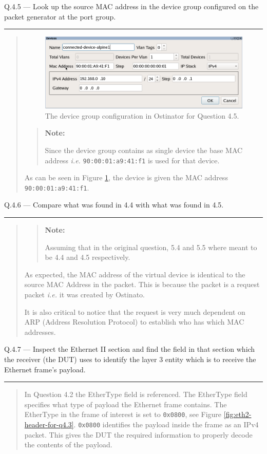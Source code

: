 \documentclass{article}
\newcommand\Que[2]{%
   \begin{samepage}
   \leavevmode\par
   \noindent
   Q.#1 --- #2\par\vspace{10pt}\hrule\vspace{10pt}
   \end{samepage}}
\newenvironment{ans}
   {\fbox{Answer}\begin{quote}\nopagebreak}
   {\end{quote}}
\newcommand\ie{\emph{i.e.}}
\newenvironment{note}{%
    \begin{quote}
    \begin{tcolorbox}[colback=gray!10,arc=0mm,boxrule=0pt]
    \textbf{Note:}%
}{%
	\end{tcolorbox}
    \end{quote}%
}
\begin{document}
\newpage

\Que{4.5}{Look up the source MAC address in the device group
configured on the packet generator at the port group.}

\begin{ans}
\begin{figure}[H]
\centering
\includegraphics[width=14cm]{data/q4.5-device-group-config.png}
\caption{The device group configuration in Ostinator for
Question 4.5.}
\label{fig:devic-config-q4.5}
\end{figure}
\begin{note}
Since the device group contains as single device the
base MAC address \ie{} \texttt{90:00:01:a9:41:f1} is used for that
device.
\end{note}

As can be seen in Figure \ref{fig:devic-config-q4.5}, the
device is given the MAC address \texttt{90:00:01:a9:41:f1}.
\end{ans}

\Que{4.6}{Compare what was found in 4.4 with what was found in
4.5.}
\begin{ans}
\begin{note}
Assuming that in the original question, 5.4 and 5.5 where
meant to be 4.4 and 4.5 respectively.
\end{note}

As expected, the MAC address of the virtual device is
identical to the source MAC Address in the packet. This is
because the packet is a request packet \ie{} it was created
by Ostinato.

It is also critical to notice that the request is very much
dependent on ARP (Address Resolution Protocol) to establish
who has which MAC addresses.
\end{ans}

\Que{4.7}{Inspect the Ethernet II section and find the field in
that section which the receiver (the DUT) uses to identify the
layer 3 entity which is to receive the Ethernet frame's
payload.}
\begin{ans}
In Question 4.2 the EtherType field is referenced. The
EtherType field specifies what type of payload the
Ethernet frame contains. The EtherType in the frame of
interest is set to \texttt{0x0800}, see Figure
\ref{fig:eth2-header-for-q4.3}. \texttt{0x0800}
identifies the payload inside the frame as an IPv4
packet. This gives the DUT the required information to
properly decode the contents of the payload.
\end{ans}
\end{document}
